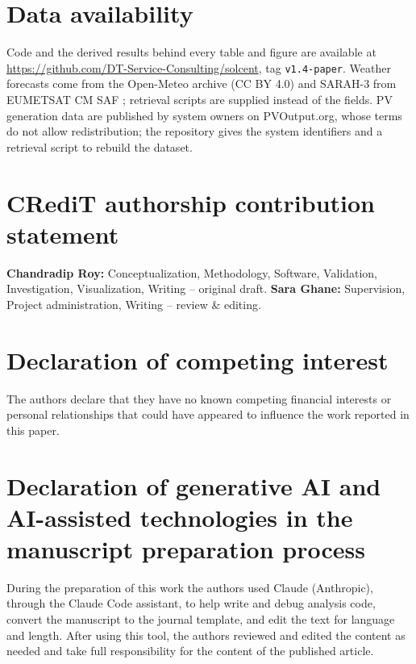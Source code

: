 
\section*{Data availability}
Code and the derived results behind every table and figure are available at \url{https://github.com/DT-Service-Consulting/solcent}, tag \texttt{v1.4-paper}. Weather forecasts come from the Open-Meteo archive (CC BY 4.0) and SARAH-3 from EUMETSAT CM SAF \citep{Pfeifroth2023}; retrieval scripts are supplied instead of the fields. PV generation data are published by system owners on PVOutput.org, whose terms do not allow redistribution; the repository gives the system identifiers and a retrieval script to rebuild the dataset.

\section*{CRediT authorship contribution statement}
\textbf{Chandradip Roy:} Conceptualization, Methodology, Software, Validation, Investigation, Visualization, Writing -- original draft. \textbf{Sara Ghane:} Supervision, Project administration, Writing -- review \& editing.

\section*{Declaration of competing interest}
The authors declare that they have no known competing financial interests or personal relationships that could have appeared to influence the work reported in this paper.

\section*{Declaration of generative AI and AI-assisted technologies in the manuscript preparation process}
During the preparation of this work the authors used Claude (Anthropic), through the Claude Code assistant, to help write and debug analysis code, convert the manuscript to the journal template, and edit the text for language and length. After using this tool, the authors reviewed and edited the content as needed and take full responsibility for the content of the published article.
